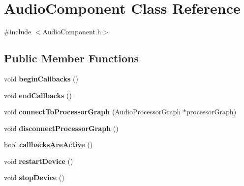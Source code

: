 \hypertarget{classAudioComponent}{\section{Audio\-Component Class Reference}
\label{classAudioComponent}
}


{\ttfamily \#include $<$Audio\-Component.\-h$>$}

\subsection*{Public Member Functions}
\begin{DoxyCompactItemize}
\item 
\hypertarget{classAudioComponent_a39ef696dde4891e20b17adb0c8057740}{void {\bfseries begin\-Callbacks} ()}\label{classAudioComponent_a39ef696dde4891e20b17adb0c8057740}

\item 
\hypertarget{classAudioComponent_a78e2a818d271fb26387d41875271e4ba}{void {\bfseries end\-Callbacks} ()}\label{classAudioComponent_a78e2a818d271fb26387d41875271e4ba}

\item 
\hypertarget{classAudioComponent_aaffe78d6dae978d9905cf2caf2f883b2}{void {\bfseries connect\-To\-Processor\-Graph} (Audio\-Processor\-Graph $\ast$processor\-Graph)}\label{classAudioComponent_aaffe78d6dae978d9905cf2caf2f883b2}

\item 
\hypertarget{classAudioComponent_a8570488c01bd73e836cfb1f153d7ec86}{void {\bfseries disconnect\-Processor\-Graph} ()}\label{classAudioComponent_a8570488c01bd73e836cfb1f153d7ec86}

\item 
\hypertarget{classAudioComponent_a5f6d992b7a5c267332416f8ee0b1aff0}{bool {\bfseries callbacks\-Are\-Active} ()}\label{classAudioComponent_a5f6d992b7a5c267332416f8ee0b1aff0}

\item 
\hypertarget{classAudioComponent_afa720e702e65def918da93505a4a9e7e}{void {\bfseries restart\-Device} ()}\label{classAudioComponent_afa720e702e65def918da93505a4a9e7e}

\item 
\hypertarget{classAudioComponent_ac85bf5472fbb1112b8429e26bcea6bc1}{void {\bfseries stop\-Device} ()}\label{classAudioComponent_ac85bf5472fbb1112b8429e26bcea6bc1}

\end{DoxyCompactItemize}
